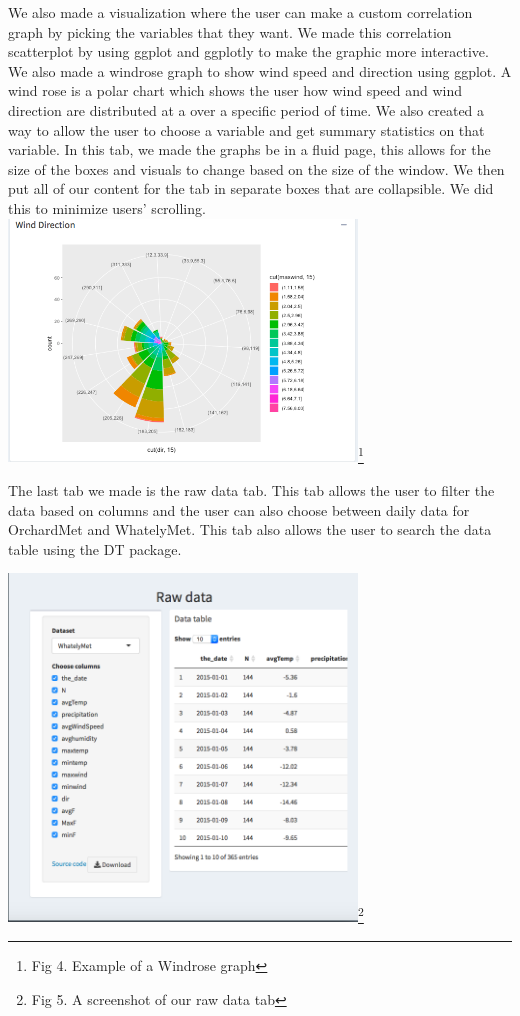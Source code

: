 \documentclass[10pt,letterpaper]{article}
\begin{document}
We also made a visualization where the user can make a custom
correlation graph by picking the variables that they want. We made this
correlation scatterplot by using ggplot and ggplotly to make the graphic
more interactive. We also made a windrose graph to show wind speed and
direction using ggplot. A wind rose is a polar chart which shows the
user how wind speed and wind direction are distributed at a over a
specific period of time. We also created a way to allow the user to
choose a variable and get summary statistics on that variable. In this
tab, we made the graphs be in a fluid page, this allows for the size of
the boxes and visuals to change based on the size of the window. We then
put all of our content for the tab in separate boxes that are
collapsible. We did this to minimize users' scrolling.
\includegraphics[width=3.64583in]{windrose.png}\footnote{Fig 4. Example
  of a Windrose graph}

The last tab we made is the raw data tab. This tab allows the user to
filter the data based on columns and the user can also choose between
daily data for OrchardMet and WhatelyMet. This tab also allows the user
to search the data table using the DT package.

\includegraphics[width=3.64583in]{raw data tab.png}\footnote{Fig 5. A
  screenshot of our raw data tab}
\end{document}
